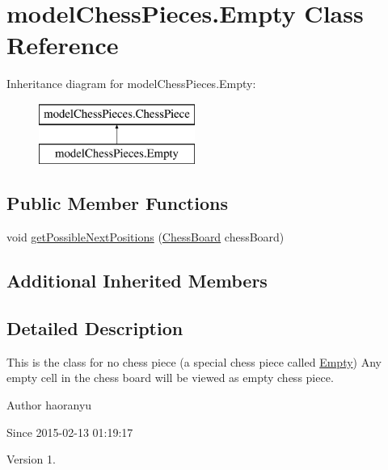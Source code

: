 \hypertarget{classmodel_chess_pieces_1_1_empty}{\section{model\+Chess\+Pieces.\+Empty Class Reference}
\label{classmodel_chess_pieces_1_1_empty}
}
Inheritance diagram for model\+Chess\+Pieces.\+Empty\+:\begin{figure}[H]
\begin{center}
\leavevmode
\includegraphics[height=2.000000cm]{classmodel_chess_pieces_1_1_empty}
\end{center}
\end{figure}
\subsection*{Public Member Functions}
\begin{DoxyCompactItemize}
\item 
void \hyperlink{classmodel_chess_pieces_1_1_empty_a9a52629a6d66359c933cf08e96bb6456}{get\+Possible\+Next\+Positions} (\hyperlink{classmodel_core_1_1_chess_board}{Chess\+Board} chess\+Board)
\end{DoxyCompactItemize}
\subsection*{Additional Inherited Members}


\subsection{Detailed Description}
This is the class for no chess piece (a special chess piece called \hyperlink{classmodel_chess_pieces_1_1_empty}{Empty}) Any empty cell in the chess board will be viewed as empty chess piece. \begin{DoxyAuthor}{Author}
haoranyu 
\end{DoxyAuthor}
\begin{DoxySince}{Since}
2015-\/02-\/13 01\+:19\+:17 
\end{DoxySince}
\begin{DoxyVersion}{Version}
1. 
\end{DoxyVersion}


